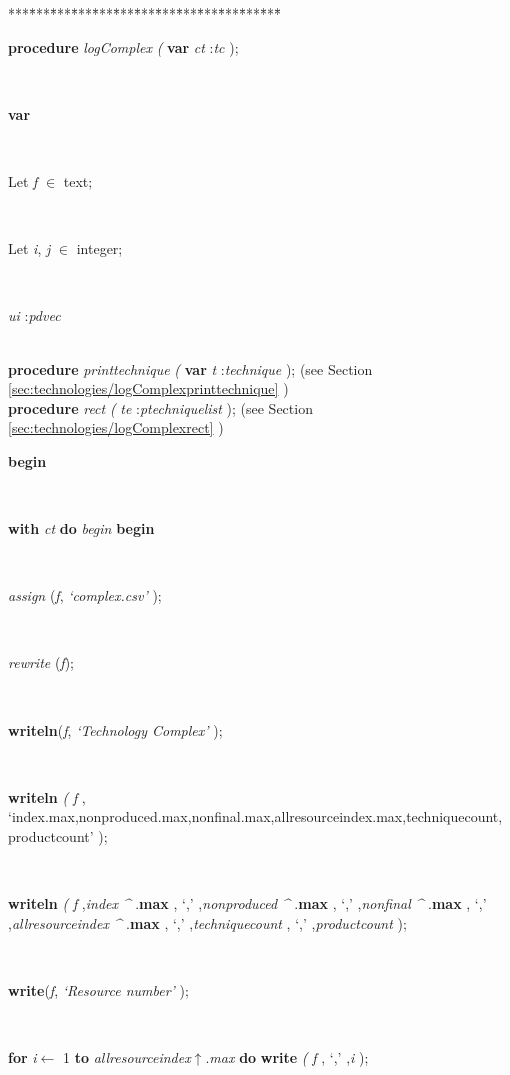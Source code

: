 \begin{tabbing}
***\=***\=***\=***\=***\=***\=***\=***\=***\=***\=***\=***\=***\=\kill
\parbox{14cm}{\textsf{\textbf{procedure}  \textit{logComplex} \textit{(} \textbf{var}  \textit{ct} :\textit{tc} );}}\\
\+\parbox{14cm}{\textsf{\textbf{var} }}\\
\parbox{14cm}{\textsf{Let \textit{f} $\in$ text;}}\\
\parbox{14cm}{\textsf{Let \textit{i}, \textit{j} $\in$ integer;}}\\
\parbox{14cm}{\textsf{\textit{ui} :\textit{pdvec} }}\\
\<\textsf{\textbf{procedure}  \textit{printtechnique} \textit{(} \textbf{var}  \textit{t} :\textit{technique} );} (see Section \ref{sec:technologies/logComplexprinttechnique} )\\
\<\textsf{\textbf{procedure}  \textit{rect} \textit{(} \textit{te} :\textit{ptechniquelist} );} (see Section \ref{sec:technologies/logComplexrect} )\\
\-\<\+\parbox{14cm}{\textsf{\textbf{begin} }}\\
\+\<\parbox{14cm}{\textsf {\textbf {with } \textsf{\textit{ct}} \textbf{ do } \textsf{\textit{begin}} \textbf{ begin } }}\\
\parbox{14cm}{\textsf{\textit{assign} (\textit{f}, \textit{\textrm{\textup { `complex.csv' } }})}; }\\
\parbox{14cm}{\textsf{\textit{rewrite} (\textit{f})}; }\\
\parbox{14cm}{\textsf{\textbf{writeln}(\textit{f}, \textit{\textrm{\textup { `Technology Complex' } }})}; }\\
\parbox{14cm}{\textsf{\textbf{writeln} \textit{(} \textit{f} ,\textrm{\textup { `index.max,nonproduced.max,nonfinal.max,allresourceindex.max,techniquecount, productcount' } });}}\\
\parbox{14cm}{\textsf{\textbf{writeln} \textit{(} \textit{f} ,\textit{index} \textit{\^{}} .\textbf{max} ,\textrm{\textup { `,' } },\textit{nonproduced} \textit{\^{}} .\textbf{max} ,\textrm{\textup { `,' } },\textit{nonfinal} \textit{\^{}} .\textbf{max} ,\textrm{\textup { `,' } },\textit{allresourceindex} \textit{\^{}} .\textbf{max} ,\textrm{\textup { `,' } },\textit{techniquecount} , \textrm{\textup { `,' } },\textit{productcount} );}}\\
\parbox{14cm}{\textsf{\textbf{write}(\textit{f}, \textit{\textrm{\textup { `Resource number' } }})}; }\\
\parbox{14cm}{\textsf {\textbf {for } \textsf{\textit{i}$\leftarrow$ 1} \textbf{ to } \textsf{\textit{allresourceindex}$\uparrow$.\textit{max}} \textbf{ do } \textsf{ \textbf{write} \textit{(} \textit{f} ,\textrm{\textup { `,' } },\textit{i} );}}}\\

\end{tabbing}
